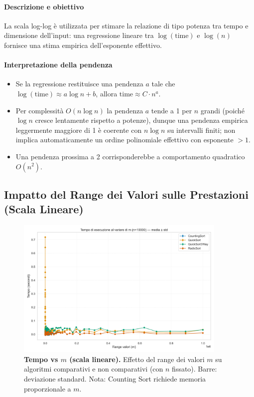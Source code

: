 \documentclass[a4paper, 11pt]{article}
\begin{document}
\paragraph{Descrizione e obiettivo}
La scala log-log è utilizzata per stimare la relazione di tipo potenza tra tempo e dimensione dell'input: una regressione lineare tra \(\log(\text{time})\) e \(\log(n)\) fornisce una stima empirica dell'esponente effettivo.

\paragraph{Interpretazione della pendenza}
\begin{itemize}
  \item Se la regressione restituisce una pendenza \(a\) tale che \(\log(\text{time}) \approx a\log n + b\), allora \(\text{time} \approx C\cdot n^{a}\).
  \item Per complessità \(O(n\log n)\) la pendenza \(a\) tende a 1 per \(n\) grandi (poiché \(\log n\) cresce lentamente rispetto a potenze), dunque una pendenza empirica leggermente maggiore di 1 è coerente con \(n\log n\) su intervalli finiti; non implica automaticamente un ordine polinomiale effettivo con esponente \(>1\).
  \item Una pendenza prossima a 2 corrisponderebbe a comportamento quadratico \(O(n^2)\).
\end{itemize}

\subsection{Impatto del Range dei Valori sulle Prestazioni (Scala Lineare)}
\begin{figure}[H]
\centering
\includegraphics[width=0.9\textwidth]{./Immagini/tempo_vs_m_lineare_improved.png}
\caption*{\textbf{Tempo vs \(m\) (scala lineare).} Effetto del range dei valori \(m\) su algoritmi comparativi e non comparativi (con \(n\) fissato). Barre: deviazione standard. Nota: Counting Sort richiede memoria proporzionale a \(m\).}
\label{fig:variazione_m_lin}
\end{figure}
\end{document}
